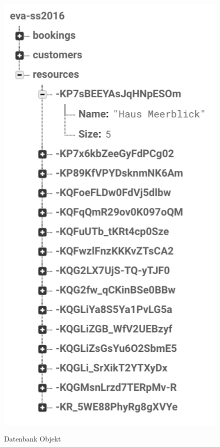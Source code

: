 \begin{figure}[H]
\begin{minipage}[t]{0.32\linewidth}
        \includegraphics[width=\linewidth]{images/backend_database_resource.png}
        \label{backend_database_resource}
        \caption{Datenbank Objekt}
    \end{minipage}
\end{figure}

